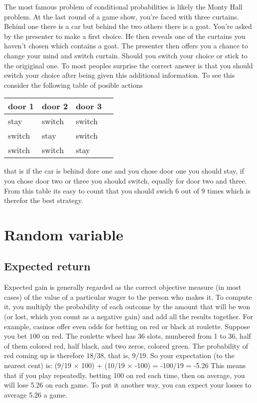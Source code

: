 \myindent The most famous problem of conditional probabilities is likely the Monty Hall problem. At the last round of a game show, you’re faced with three curtains. Behind one there is a car but behind the two others there is a goat. You’re asked by the presenter to make a first choice. He then reveals one of the curtains you haven’t chosen which contains a goat. The presenter then offers you a chance to change your mind and switch curtain. Should you switch your choice or stick to the origiginal one. To most peoples surprise the correct answer is that you should switch your choice after being given this additional information. To see this consider the following table of posible actions
\begin{table}[H]
\centering
\begin{tabular}{|l|l|l|l|}
\hline
\textbf{door 1} & \textbf{door 2} & \textbf{door 3} \\ \hline
stay            & switch          & switch          \\ \hline
switch          & stay            & switch          \\ \hline
switch          & switch          & stay            \\ \hline
\end{tabular}
\end{table}
that is if the car is behind dore one and you chose door one you should stay, if you chose door two or three you shoukd switch, equally for door two and three. From this table its easy to count that you should swich $6$ out of $9$ times which is therefor the best strategy.


\section{Random variable}
\subsection{Expected return}
Expected gain is generally regarded as the correct objective measure (in most cases) of the value of a particular wager to the person who makes it. To compute it, you multiply the probability of each outcome by the amount that will be won (or lost, which you count as a negative gain) and add all the results together. For example, casinos offer even odds for betting on red or black at roulette. Suppose you bet $100$ on red. The roulette wheel has 36 slots, numbered from 1 to 36, half of them colored red, half black, and two zeros, colored green. The probability of red coming up is therefore 18/38, that is, 9/19. So your expectation (to the nearest cent) is: (9/19 × 100) + (10/19 × -100) = -100/19 = -5.26 This means that if you play repeatedly, betting 100 on red each time, then on average, you will lose 5.26 on each game. To put it another way, you can expect your losses to average 5.26 a game.


